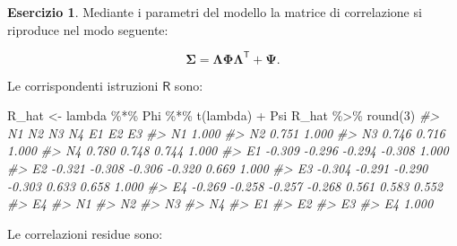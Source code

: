\documentclass[
  11pt,
]{krantz}
\makeatletter
\newenvironment{Shaded}{\begin{snugshade}}{\end{snugshade}}
\newcommand{\CommentTok}[1]{\textcolor[rgb]{0.37,0.37,0.37}{\textit{#1}}}
\newcommand{\DecValTok}[1]{\textcolor[rgb]{0.06,0.06,0.06}{#1}}
\newcommand{\FunctionTok}[1]{\textcolor[rgb]{0,0,0}{#1}}
\newcommand{\NormalTok}[1]{#1}
\newcommand{\OtherTok}[1]{\textcolor[rgb]{0.37,0.37,0.37}{#1}}
\newcommand{\SpecialCharTok}[1]{\textcolor[rgb]{0,0,0}{#1}}
\newenvironment{kframe}{%
\medskip{}
\setlength{\fboxsep}{.8em}
 \def\at@end@of@kframe{}%
 \ifinner\ifhmode%
  \def\at@end@of@kframe{\end{minipage}}%
  \begin{minipage}{\columnwidth}%
 \fi\fi%
 \def\FrameCommand##1{\hskip\@totalleftmargin \hskip-\fboxsep
 \colorbox{shadecolor}{##1}\hskip-\fboxsep
     \hskip-\linewidth \hskip-\@totalleftmargin \hskip\columnwidth}%
 \MakeFramed {\advance\hsize-\width
   \@totalleftmargin\z@ \linewidth\hsize
   \@setminipage}}%
 {\par\unskip\endMakeFramed%
 \at@end@of@kframe}
\renewenvironment{Shaded}{\begin{kframe}}{\end{kframe}}
\theoremstyle{definition}
\theoremstyle{definition}
\theoremstyle{definition}
\newtheorem{exercise}{Esercizio}[chapter]
\theoremstyle{definition}
\theoremstyle{remark}
\makeatother
\begin{document}
\begin{exercise}
Mediante i parametri del modello la matrice di correlazione si riproduce nel modo seguente:

\[
\boldsymbol{\Sigma} =\boldsymbol{\Lambda} \boldsymbol{\Phi} \boldsymbol{\Lambda}^{\mathsf{T}} + \boldsymbol{\Psi}. 
\]

Le corrispondenti istruzioni \(\textsf{R}\) sono:

\begin{Shaded}
\begin{Highlighting}[]
\NormalTok{R\_hat }\OtherTok{\textless{}{-}}\NormalTok{ lambda }\SpecialCharTok{\%*\%}\NormalTok{ Phi }\SpecialCharTok{\%*\%} \FunctionTok{t}\NormalTok{(lambda) }\SpecialCharTok{+}\NormalTok{ Psi}
\NormalTok{R\_hat }\SpecialCharTok{\%\textgreater{}\%}
  \FunctionTok{round}\NormalTok{(}\DecValTok{3}\NormalTok{)}
\CommentTok{\#\textgreater{}    N1     N2     N3     N4     E1     E2     E3    }
\CommentTok{\#\textgreater{} N1  1.000                                          }
\CommentTok{\#\textgreater{} N2  0.751  1.000                                   }
\CommentTok{\#\textgreater{} N3  0.746  0.716  1.000                            }
\CommentTok{\#\textgreater{} N4  0.780  0.748  0.744  1.000                     }
\CommentTok{\#\textgreater{} E1 {-}0.309 {-}0.296 {-}0.294 {-}0.308  1.000              }
\CommentTok{\#\textgreater{} E2 {-}0.321 {-}0.308 {-}0.306 {-}0.320  0.669  1.000       }
\CommentTok{\#\textgreater{} E3 {-}0.304 {-}0.291 {-}0.290 {-}0.303  0.633  0.658  1.000}
\CommentTok{\#\textgreater{} E4 {-}0.269 {-}0.258 {-}0.257 {-}0.268  0.561  0.583  0.552}
\CommentTok{\#\textgreater{}    E4    }
\CommentTok{\#\textgreater{} N1       }
\CommentTok{\#\textgreater{} N2       }
\CommentTok{\#\textgreater{} N3       }
\CommentTok{\#\textgreater{} N4       }
\CommentTok{\#\textgreater{} E1       }
\CommentTok{\#\textgreater{} E2       }
\CommentTok{\#\textgreater{} E3       }
\CommentTok{\#\textgreater{} E4  1.000}
\end{Highlighting}
\end{Shaded}

Le correlazioni residue sono:


\end{exercise}
\end{document}
